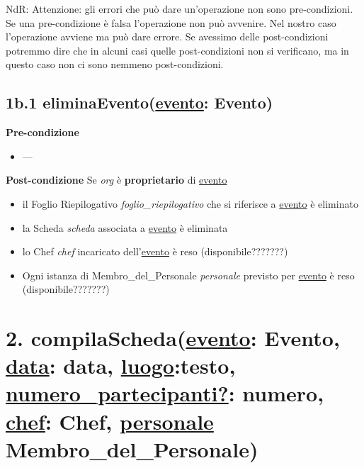 \documentclass[12pt]{extarticle}
\begin{document}
NdR: Attenzione: gli errori che può dare un’operazione non sono pre-condizioni. Se una pre-condizione è falsa l’operazione non può avvenire. Nel nostro caso l’operazione avviene ma può dare errore. Se avessimo delle post-condizioni potremmo dire che in alcuni casi quelle post-condizioni non si verificano, ma in questo caso non ci sono nemmeno post-condizioni.

\subsection*{1b.1 eliminaEvento(\underline{evento}: Evento)}

\textbf{Pre-condizione}
\begin{itemize}
  \item ---
\end{itemize}
\textbf{Post-condizione} Se \textit{org} è \textbf{proprietario} di \underline{evento}
\begin{itemize}
  \item il Foglio Riepilogativo \textit{foglio\_riepilogativo} che si riferisce a \underline{evento} è eliminato
  \item la Scheda \textit{scheda} associata a \underline{evento} è eliminata
  \item lo Chef \textit{chef} incaricato dell'\underline{evento} è reso (disponibile???????)
  \item Ogni istanza di Membro\_del\_Personale \textit{personale} previsto per \underline{evento} è reso (disponibile???????)
\end{itemize}


\section*{2. compilaScheda(\underline{evento}: Evento, \underline{data}: data, \underline{luogo}:testo, \underline{numero\_partecipanti?}: numero, \underline{chef}: Chef, \underline{personale} Membro\_del\_Personale)}
\end{document}
